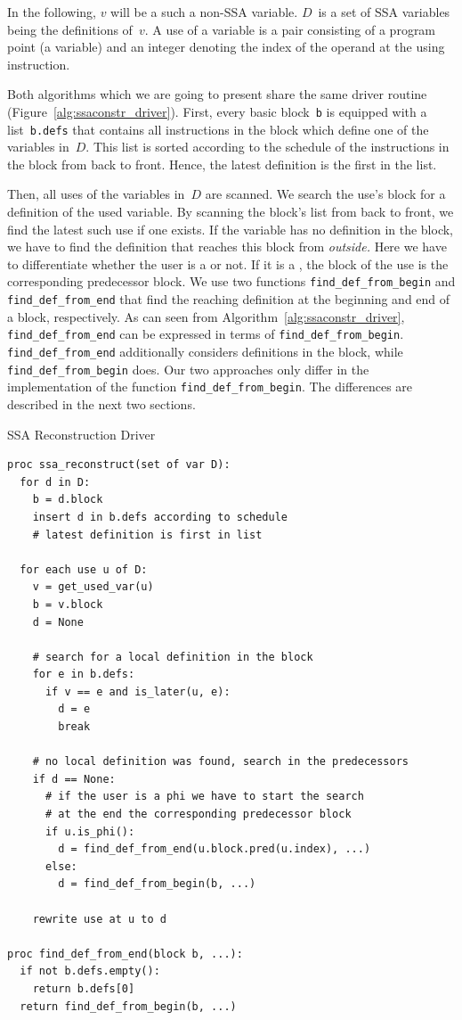 In the following, $v$ will be a such a non-SSA variable.
$D$~is a set of SSA variables being the definitions of~$v$.
A use of a variable is a pair consisting of a program point (a variable) and an integer denoting the index of the operand at the using instruction.

Both algorithms which we are going to present share the same driver routine (Figure~\ref{alg:ssaconstr_driver}).
First, every basic block~\verb|b| is equipped with a list~\verb|b.defs| that contains all instructions in the block which define one of the variables in~$D$.
This list is sorted according to the schedule of the instructions in the block from back to front.
Hence, the latest definition is the first in the list.

Then, all uses of the variables in~$D$ are scanned.
We search the use's block for a definition of the used variable.
By scanning the block's list from back to front, we find the latest such use if one exists. 
If the variable has no definition in the block, we have to find the definition that reaches this block from \emph{outside.}
Here we have to differentiate whether the user is a \phifun or not.
If it is a \phifun, the block of the use is the corresponding predecessor block.
We use two functions \verb|find_def_from_begin| and \verb|find_def_from_end| that find the reaching definition at the beginning and end of a block, respectively. 
As can seen from Algorithm~\ref{alg:ssaconstr_driver}, \verb|find_def_from_end| can be expressed in terms of \verb|find_def_from_begin|. 
\verb|find_def_from_end| additionally considers definitions in the block, while \verb|find_def_from_begin| does.
Our two approaches only differ in the implementation of the function \verb|find_def_from_begin|.
The differences are described in the next two sections.
\begin{algorithm}
	\caption{SSA Reconstruction Driver}
	\label{alg:ssaconstr_driver}

\begin{verbatim}
proc ssa_reconstruct(set of var D):
  for d in D:
    b = d.block
    insert d in b.defs according to schedule
    # latest definition is first in list

  for each use u of D:
    v = get_used_var(u)
    b = v.block
    d = None

    # search for a local definition in the block
    for e in b.defs:
      if v == e and is_later(u, e):
        d = e
        break
        
    # no local definition was found, search in the predecessors
    if d == None:
      # if the user is a phi we have to start the search 
      # at the end the corresponding predecessor block 
      if u.is_phi():
        d = find_def_from_end(u.block.pred(u.index), ...)
      else:
        d = find_def_from_begin(b, ...)

    rewrite use at u to d

proc find_def_from_end(block b, ...):
  if not b.defs.empty():
    return b.defs[0]
  return find_def_from_begin(b, ...)
\end{verbatim}
\end{algorithm}

